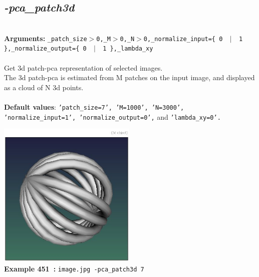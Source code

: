 \documentclass[a4paper,11pt,twoside]{book}
\begin{document}
\subsection{\emph{-pca\_patch3d} }\vspace*{-0.5em}
~\\\textbf{Arguments: } 
{\small \texttt{\_patch\_size$>$0,\_M$>$0,\_N$>$0,\_normalize\_input=\{ 0 ~$|$~ 1 \},\_normalize\_output=\{ 0 ~$|$~ 1 \},\_lambda\_xy}}\\~\\
Get 3d patch-pca representation of selected images.
~\\The 3d patch-pca is estimated from M patches on the input image, and displayed as a cloud of N 3d points.
~\\~\\\textbf{Default values}: {\small \texttt{'patch\_size=7', 'M=1000', 'N=3000', 'normalize\_input=1', 'normalize\_output=0',} and \texttt{'lambda\_xy=0'.}}
\begin{center}\includegraphics[keepaspectratio=true,height=7cm,width=\textwidth]{img/gmic_def451.jpg}\\
{\footnotesize \textbf{Example 451~:} \texttt{image.jpg -pca\_patch3d 7}}
\end{center}
\end{document}
